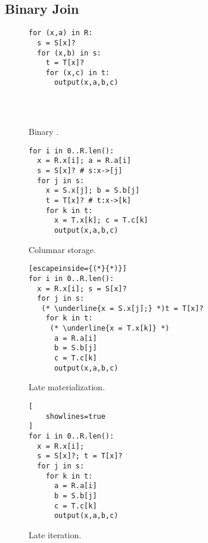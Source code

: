\subsection{Binary Join}\label{sec:binary-join}

\begin{figure*}
  \begin{subfigure}[t]{0.21\linewidth}
    \begin{lstlisting}[showlines=true]
for (x,a) in R:
  s = S[x]?
  for (x,b) in s:
    t = T[x]?
    for (x,c) in t:
      output(x,a,b,c)




\end{lstlisting}
    \caption{Binary \FJ.}
    \label{fig:bj-loop}
  \end{subfigure}
  \begin{subfigure}[t]{0.27\linewidth}
    \centering
    \begin{lstlisting}[showlines=true]
for i in 0..R.len():
  x = R.x[i]; a = R.a[i]
  s = S[x]? # s:x->[j]
  for j in s:
    x = S.x[j]; b = S.b[j]
    t = T[x]? # t:x->[k]
    for k in t:
      x = T.x[k]; c = T.c[k]
      output(x,a,b,c)

\end{lstlisting}
    \caption{Columnar storage.}
    \label{fig:column-loop}
  \end{subfigure}
  \begin{subfigure}[t]{0.25\linewidth}
    \centering
    \begin{lstlisting}[escapeinside={(*}{*)}]
for i in 0..R.len():
  x = R.x[i]; s = S[x]?
  for j in s:
   (* \underline{x = S.x[j];} *)t = T[x]?
    for k in t:
     (* \underline{x = T.x[k]} *)
      a = R.a[i]
      b = S.b[j]
      c = T.c[k]
      output(x,a,b,c)
\end{lstlisting}
    \caption{Late materialization.}
    \label{fig:late-materialization}
  \end{subfigure}
  \begin{subfigure}[t]{0.25\linewidth}
    \centering
    \begin{lstlisting}[
    showlines=true
]
for i in 0..R.len():
  x = R.x[i]; 
  s = S[x]?; t = T[x]?
  for j in s:
    for k in t:
      a = R.a[i]
      b = S.b[j]
      c = T.c[k]
      output(x,a,b,c)

\end{lstlisting}
    \caption{Late iteration.}
    \label{fig:factorized-loop}
  \end{subfigure}
  \caption{Execution of binary join for the clover query~\ref{fig:bj-loop},
    and three transformations.
    The first transformation~\ref{fig:column-loop} makes the algorithm work
    on column-wise storage instead of a row-wise one;
    the second transformation~\ref{fig:late-materialization} performs
    the classic late materialization optimization;
    the last one is another transformation that we call
    late iteration~\ref{fig:factorized-loop}.
  }
\end{figure*}

